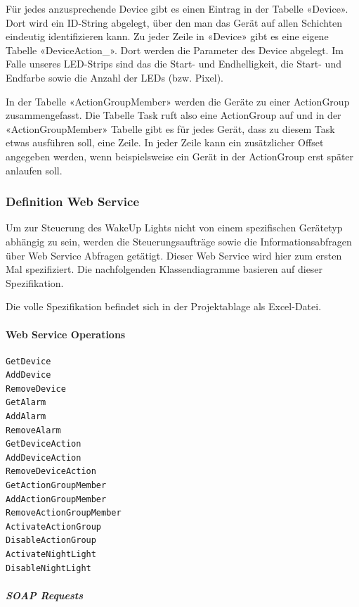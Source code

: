 \documentclass[]{article}
\let\oldparagraph\paragraph
\renewcommand{\paragraph}[1]{\oldparagraph{#1}\mbox{}}
\let\oldsubparagraph\subparagraph
\renewcommand{\subparagraph}[1]{\oldsubparagraph{#1}\mbox{}}
\begin{document}
Für jedes anzusprechende Device gibt es einen Eintrag in der Tabelle
«Device». Dort wird ein ID-String abgelegt, über den man das Gerät auf
allen Schichten eindeutig identifizieren kann. Zu jeder Zeile in
«Device» gibt es eine eigene Tabelle «DeviceAction\_». Dort werden die
Parameter des Device abgelegt. Im Falle unseres LED-Strips sind das die
Start- und Endhelligkeit, die Start- und Endfarbe sowie die Anzahl der
LEDs (bzw. Pixel).

In der Tabelle «ActionGroupMember» werden die Geräte zu einer
ActionGroup zusammengefasst. Die Tabelle Task ruft also eine ActionGroup
auf und in der «ActionGroupMember» Tabelle gibt es für jedes Gerät, dass
zu diesem Task etwas ausführen soll, eine Zeile. In jeder Zeile kann ein
zusätzlicher Offset angegeben werden, wenn beispielsweise ein Gerät in
der ActionGroup erst später anlaufen soll.

\subsubsection{Definition Web Service}\label{definition-web-service}

Um zur Steuerung des WakeUp Lights nicht von einem spezifischen
Gerätetyp abhängig zu sein, werden die Steuerungsaufträge sowie die
Informationsabfragen über Web Service Abfragen getätigt. Dieser Web
Service wird hier zum ersten Mal spezifiziert. Die nachfolgenden
Klassendiagramme basieren auf dieser Spezifikation.

Die volle Spezifikation befindet sich in der Projektablage als
Excel-Datei.

\paragraph{Web Service Operations}\label{web-service-operations}

\begin{lstlisting}
GetDevice
AddDevice
RemoveDevice
GetAlarm
AddAlarm
RemoveAlarm
GetDeviceAction
AddDeviceAction
RemoveDeviceAction
GetActionGroupMember
AddActionGroupMember
RemoveActionGroupMember
ActivateActionGroup
DisableActionGroup
ActivateNightLight
DisableNightLight
\end{lstlisting}

\subparagraph{SOAP Requests}\label{soap-requests}
\end{document}
